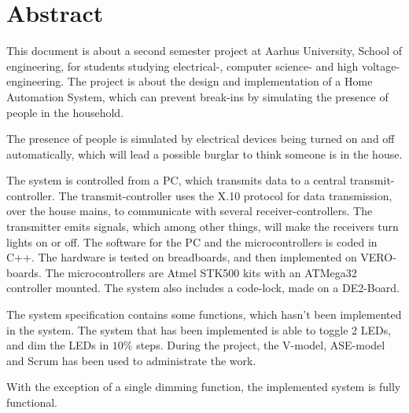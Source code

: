 \chapter{Abstract}
This document is about a second semester project at Aarhus University, School of engineering, for students studying electrical-, computer science- and high voltage-engineering. The project is about the design and implementation of a Home Automation System, which can prevent break-ins by simulating the presence of people in the household.

The presence of people is simulated by electrical devices being turned on and off automatically, which will lead a possible burglar to think someone is in the house.

The system is controlled from a PC, which transmits data to a central transmit-controller. The transmit-controller uses the X.10 protocol for data transmission, over the house mains, to communicate with several receiver-controllers. The transmitter emits signals, which among other things, will make the receivers turn lights on or off.
The software for the PC and the microcontrollers is coded in C++. The hardware is tested on breadboards, and then implemented on VERO-boards. The microcontrollers are Atmel STK500 kits with an ATMega32 controller mounted. The system also includes a code-lock, made on a DE2-Board.

The system specification contains some functions, which hasn’t been implemented in the system.
The system that has been implemented is able to toggle 2 LEDs, and dim the LEDs in $10\%$ steps.
During the project, the V-model, ASE-model and Scrum has been used to administrate the work.

With the exception of a single dimming function, the implemented system is fully functional. 


\clearpage